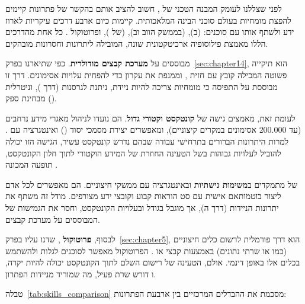 \label{sec:chapter15}


לפני שצללנו לעומק המבנה הטכני של , חשוב להציב אותם בהקשר של פתרונות קיימים להפצת מומחיות בעולם סוכני הבינה המלאכותית. קיימות כיום ארבע דרכים עיקריות לארוז ידע ולשתף אותו עם סוכנים:  (ב),  (בממשק הווב וב),  (של ), ופרוטוקול . כל אחת מהדרכים הללו מאמצת פילוסופיה ארכיטקטונית שונה, המובילה ליתרונות וחסרונות מובהקים.

 מבוססים על \textbf{מערכת קבצים מודולרית}. כפי שתיארנו בפרק~\ref{sec:chapter14},  הוא תיקייה פשוטה המכילה קובץ  עם חזית , וממנפת את עקרון  כדי להפחית עלויות אסימונים. דרך זו מבוססת על התפיסה כי מומחיות צריכה להיות ניידת, ניתנת לגרסנות (דרך ), וניטרלית מבחינת ספק ().

לעומת זאת, \cite{anthropic2025projects} מאמצים גישה של \textbf{קונטקסט וקטורי גדול}. הם נועדו לניהול מאגרי מידע נרחבים (עד \num{200,000} אסימונים במקרים קיצוניים), ומאפשרים יצירת מסמכי יסוד () ואינטגרציה עם . למרות היתרונות הברורים בתרחישי עבודה שבהם נדרש קונטקסט עשיר, הגישה הזו יכולה להוביל לעלויות גבוהות בשל הטעינה החוזרת של המידע הוקטורי לתוך חלון הקונטקסט, תופעה המכונה \cite{anthropic2025thrashing}.

 של  מתמקדים ב\textbf{משימות נישתיות} ובאינטגרציה עם ממשקי  חיצוניים. הם מאפשרים לכל אדם ליצור \"בוט\" מותאם אישית עם סט הוראות קבוע וקובצי ידע מצורפים. מודל זה משתף את יתרונות הניידות (דרך ה), אך מוגבל בגודל ובעלויות הקונטקסט, וחסר את הגמישות של  המבוססים על מערכת קבצים.

לבסוף, \textbf{פרוטוקול }\cite{anthropic2024mcp}, שדנו עליו בפרק~\ref{sec:chapter5}, הוא דרך פורמלית לרשום כלים חיצוניים (כמו  או שרתי נתונים) באמצעות קבצי  או . הפרוטוקול מאפשר לסוכנים לגלות ולהשתמש בכלים אלו באופן דינמי. אולם, הטעינה של רישום  השלם לתוך הקונטקסט יכולה להיות יקרה, ו דורש שרת פעיל, מה שמוריד מניידות הפתרון.

טבלה~\ref{tab:skills_comparison} מסכמת את ההבדלים המרכזיים בין ארבעת הפתרונות:

